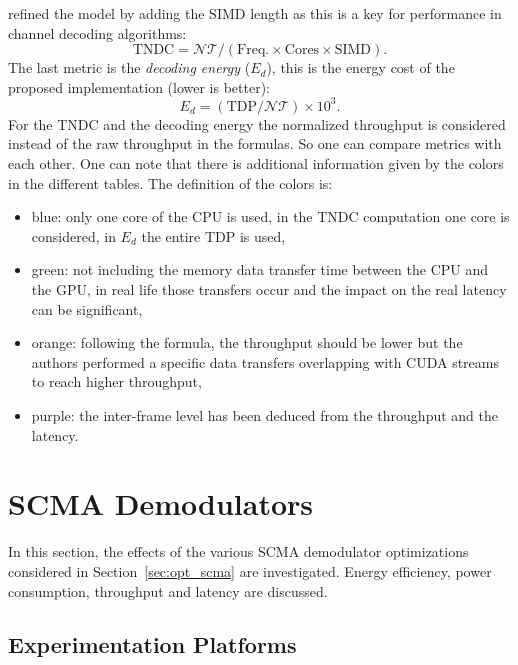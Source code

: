 refined the model by adding the SIMD length as this is a key for performance in
channel decoding algorithms:
\begin{equation}
  \text{TNDC} = \mathcal{NT} / (\text{Freq.} \times \text{Cores} \times \text{SIMD}).
\end{equation}
The last metric is the \emph{decoding energy} ($E_d$), this is the energy cost
of the proposed implementation (lower is better):
\begin{equation}
  E_d = (\text{TDP} / \mathcal{NT}) \times 10^3.
\end{equation}
For the TNDC and the decoding energy the normalized throughput is considered
instead of the raw throughput in the formulas. So one can compare metrics
with each other. One can note that there is additional information given by
the colors in the different tables. The definition of the colors is:
\begin{itemize}
  \item {\color{Paired-1}blue}: only one core of the CPU is used, in the TNDC
    computation one core is considered, in $E_d$ the entire TDP is used,
  \item {\color{Paired-3}green}: not including the memory data transfer time
    between the CPU and the GPU, in real life those transfers occur and the
    impact on the real latency can be significant,
  \item {\color{Paired-7}orange}: following the formula, the throughput should
    be lower but the authors performed a specific data transfers overlapping
    with CUDA streams to reach higher throughput,
  \item {\color{Paired-9}purple}: the inter-frame level has been deduced from
    the throughput and the latency.
\end{itemize}

\section{SCMA Demodulators}
\label{sec:eval_scma}

In this section, the effects of the various SCMA demodulator optimizations
considered in Section~\ref{sec:opt_scma} are investigated. Energy efficiency,
power consumption, throughput and latency are discussed.

\subsection{Experimentation Platforms}

